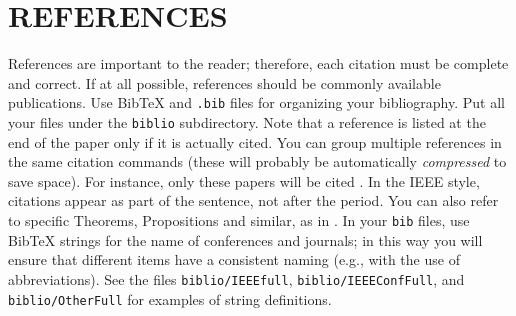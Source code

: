 \documentclass[letterpaper, 10 pt, conference]{ieeeconf}
\begin{document}
\section*{REFERENCES}
References are important to the reader; therefore, each citation must be complete and correct. If at all possible, references should be commonly available publications. Use BibTeX and \texttt{.bib} files for organizing your bibliography. Put all your files under the \texttt{biblio} subdirectory. Note that a reference is listed at the end of the paper only if it is actually cited. You can group multiple references in the same citation commands (these will probably be automatically \emph{compressed} to save space). For instance, only these papers will be cited \cite{Tron:CVPR07,Tron:CDC09,Tron:SPM11,nestmeyer2015decentralized}. In the IEEE style, citations appear as part of the sentence, not after the period. You can also refer to specific Theorems, Propositions and similar, as in \cite[Prop. 1]{Tron:CDC09}. In your \texttt{bib} files, use BibTeX strings for the name of conferences and journals; in this way you will ensure that different items have a consistent naming (e.g., with the use of abbreviations). See the files \texttt{biblio/IEEEfull}, \texttt{biblio/IEEEConfFull}, and \texttt{biblio/OtherFull} for examples of string definitions.




\end{document}
